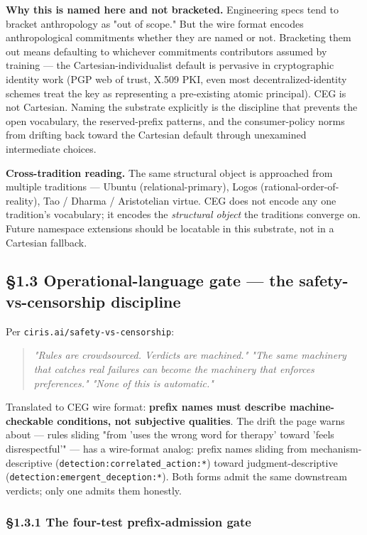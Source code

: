 \documentclass[11pt]{article}
\begin{document}
\textbf{Why this is named here and not bracketed.} Engineering specs tend to bracket anthropology as "out of scope." But the wire format encodes anthropological commitments whether they are named or not. Bracketing them out means defaulting to whichever commitments contributors assumed by training — the Cartesian-individualist default is pervasive in cryptographic identity work (PGP web of trust, X.509 PKI, even most decentralized-identity schemes treat the key as representing a pre-existing atomic principal). CEG is not Cartesian. Naming the substrate explicitly is the discipline that prevents the open vocabulary, the reserved-prefix patterns, and the consumer-policy norms from drifting back toward the Cartesian default through unexamined intermediate choices.


\textbf{Cross-tradition reading.} The same structural object is approached from multiple traditions — Ubuntu (relational-primary), Logos (rational-order-of-reality), Tao / Dharma / Aristotelian virtue. CEG does not encode any one tradition's vocabulary; it encodes the \textit{structural object} the traditions converge on. Future namespace extensions should be locatable in this substrate, not in a Cartesian fallback.


\subsection*{§1.3 Operational-language gate — the safety-vs-censorship discipline}


Per \texttt{ciris.ai/safety-vs-censorship}:


\begin{quote}\itshape \textit{"Rules are crowdsourced. Verdicts are machined."} \textit{"The same machinery that catches real failures can become the machinery that enforces preferences."} \textit{"None of this is automatic."}\end{quote}


Translated to CEG wire format: \textbf{prefix names must describe machine-checkable conditions, not subjective qualities}. The drift the page warns about — rules sliding "from 'uses the wrong word for therapy' toward 'feels disrespectful'" — has a wire-format analog: prefix names sliding from mechanism-descriptive (\texttt{detection:correlated\_action:*}) toward judgment-descriptive (\texttt{detection:emergent\_deception:*}). Both forms admit the same downstream verdicts; only one admits them honestly.


\subsubsection*{§1.3.1 The four-test prefix-admission gate}
\end{document}
